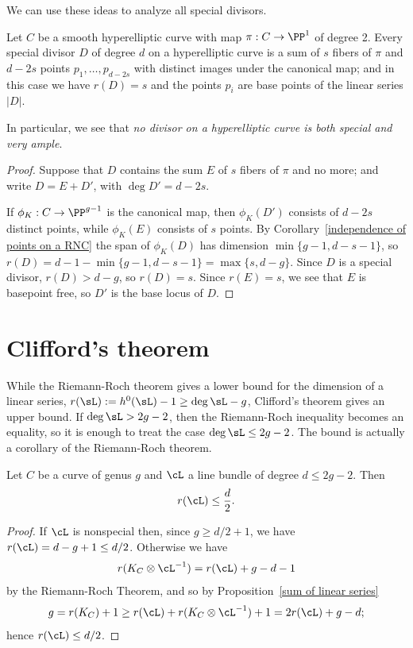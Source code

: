We can use these ideas to analyze all special divisors.

\begin{corollary}\label{special on hyperelliptic} Let $C$ be a smooth hyperelliptic curve with map $\pi: C\to \PP^1$ of degree 2.
Every special divisor $D$ of degree $d$ on a hyperelliptic curve is a sum of $s$ fibers of $\pi$ and $d-2s$ points $p_1,\dots,p_{d-2s}$ with distinct images under the canonical map; and in this case we have $r(D) = s$ and the points $p_i$ are base points of the linear series $|D|$.
\end{corollary}

In particular, we see that \emph{no divisor on a hyperelliptic curve is both special and very ample}.

\begin{proof}
Suppose that $D$ contains the sum $E$ of $s$ fibers of $\pi$ and no more; and write $D = E+D'$, with $\deg D' = d-2s$.
 
If $\phi_K:C \to \PP^{g-1}$ is the canonical map, then $\phi_K(D')$ consists of $d-2s$ distinct points, while $\phi_K(E)$ consists of
$s$ points. By Corollary~\ref{independence of points on a RNC} the span of $\phi_K(D)$ has dimension $\min\{g-1, d-s-1\}$, so 
$r(D) = d-1-\min\{g-1, d-s-1\} = \max \{s,d-g\}$. Since $D$ is a special divisor, $r(D) > d-g$, so $r(D) = s$. 
Since $r(E) =s$, we see that $E$ is basepoint free, so $D'$ is the base locus of $D$.
\end{proof}

\section{Clifford's theorem}

While the Riemann-Roch theorem gives a lower bound for the dimension of a linear series, $r(\sL) := h^0(\sL)-1 \geq \deg \sL -g$, Clifford's theorem
gives an upper bound. If $\deg \sL>2g-2$, then the Riemann-Roch inequality becomes an equality, so it is enough to treat the case $\deg \sL \leq 2g-2$. The bound is actually a corollary of the Riemann-Roch theorem.

\begin{corollary}\label{Clifford bound}
 Let $C$ be a curve of genus $g$ and $\cL$ a line bundle of degree $d \leq 2g-2$. Then
$$
r(\cL) \leq \frac{d}{2}.
$$
\end{corollary}

\begin{proof}
If $\cL$ is nonspecial then, since $g\geq d/2 + 1$, we have $r(\cL) = d-g+1\leq d/2$.
Otherwise we have
$$
r(K_C\otimes \cL^{-1}) = r(\cL) +g - d - 1
$$
by the Riemann-Roch Theorem,
and so by Proposition~\ref{sum of linear series}
$$
g = r(K_C)+1  \geq r(\cL) + r(K_C\otimes \cL^{-1}) +1  = 2r(\cL) +g - d;
$$
hence $r(\cL) \leq d/2$.
\end{proof}

